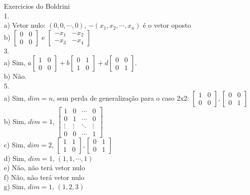 \documentclass[12pt]{article}
\begin{document}
{\Huge Exercicios do Boldrini}\\

1.\\
a) Vetor nulo: $(0,0,\cdots,0)$, $-(x_{1},x_{2},\cdots,x_{n})$ é o vetor oposto\\
b) $\begin{bmatrix}0&0\\0&0\end{bmatrix}$ e 
$\begin{bmatrix}-x_{1}&-x_{2}\\-x_{3}&-x_{4}\end{bmatrix}$\\

3.\\
a) Sim, $a\begin{bmatrix}1&0\\0&0\end{bmatrix} + b\begin{bmatrix}0&1\\1&0\end{bmatrix} +
		 d\begin{bmatrix}0&0\\0&1\end{bmatrix}$.\\
b) Não.\\

5.\\
a) Sim, $dim = n$, sem perda de generalização para o caso 2x2: $\begin{bmatrix}1&0\\0&0\end{bmatrix}, \begin{bmatrix}0&0\\0&1\end{bmatrix}$\\
b) Sim, $dim = 1$, $\begin{bmatrix}1&0&\cdots&0\\0&1&\cdots&0\\\vdots&\vdots&\ddots&\vdots\\0&0&\cdots&1\end{bmatrix}$\\
c) Sim, $dim = 2$,
$\begin{bmatrix}1&1\\1&0\end{bmatrix}, \begin{bmatrix}0&1\\0&1\end{bmatrix}$\\
d) Sim, $dim = 1$, $(1,1,\cdots,1)$\\
e) Não, não terá vetor nulo\\
f) Não, não terá vetor nulo\\
g) Sim, $dim = 1$, $(1,2,3)$\\
\end{document}
